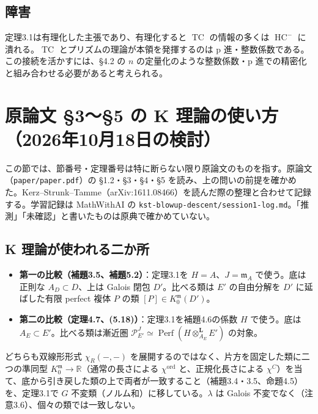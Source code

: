 \documentclass[11pt,a4paper]{ltjsarticle}
\theoremstyle{plain}
\theoremstyle{definition}
\theoremstyle{remark}
\newcommand{\m}{\mathfrak{m}}
\newcommand{\Perf}{\operatorname{Perf}}
\newcommand{\TC}{\operatorname{TC}}
\newcommand{\HC}{\operatorname{HC}}
\newcommand{\Lotimes}{\otimes^{\mathbf{L}}}
\begin{document}
\subsection{障害}
定理3.1は有理化した主張であり、有理化すると $\TC$ の情報の多くは $\HC^-$ に潰れる。$\TC$ とプリズムの理論が本領を発揮するのは p 進・整数係数である。この接続を活かすには、§4.2 の $n$ の定量化のような整数係数・p 進での精密化と組み合わせる必要があると考えられる。

\section{原論文 §3〜§5 の K 理論の使い方（2026年10月18日の検討）}

この節では、節番号・定理番号は特に断らない限り原論文のものを指す。原論文（\texttt{paper/paper.pdf}）の §1.2・§3・§4・§5 を読み、上の問いの前提を確かめた。Kerz--Strunk--Tamme（arXiv:1611.08466）を読んだ際の整理と合わせて記録する。学習記録は MathWithAI の \texttt{kst-blowup-descent/session1-log.md}。「推測」「未確認」と書いたものは原典で確かめていない。

\subsection{K 理論が使われる二か所}
\begin{itemize}
  \item \textbf{第一の比較（補題3.5、補題5.2）}：定理3.1を $H=A$、$J=\m_A$ で使う。底は正則な $A_D\subset D$、上は Galois 閉包 $D'$。比べる類は $E'$ の自由分解を $D'$ に延ばした有限 perfect 複体 $P$ の類 $[P]\in K_0^{\m}(D')$。
  \item \textbf{第二の比較（定理4.7、(5.18)）}：定理3.1を補題4.6の係数 $H$ で使う。底は $A_E\subset E'$。比べる類は漸近圏 $\mathcal P^J_{E'}\simeq\Perf(H\Lotimes_{A_E}E')$ の対象。
\end{itemize}
どちらも双線形形式 $\chi_R(-,-)$ を展開するのではなく、片方を固定した類に二つの準同型 $K_0^{\m}\to\mathbb R$（通常の長さによる $\chi^{\mathrm{ord}}$ と、正規化長さによる $\chi^{C}$）を当て、底から引き戻した類の上で両者が一致すること（補題3.4・3.5、命題4.5）を、定理3.1で $G$ 不変類（ノルム和）に移している。$\lambda$ は Galois 不変でなく（注意3.6）、個々の類では一致しない。
\end{document}
